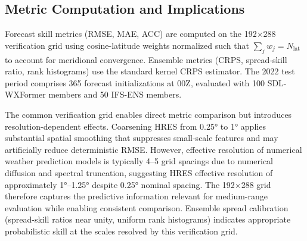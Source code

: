 \documentclass{agujournal2019}
\begin{document}
\subsection{Metric Computation and Implications}

Forecast skill metrics (RMSE, MAE, ACC) are computed on the 192×288 verification grid using cosine-latitude weights normalized such that $\sum_{j} w_j = N_{\text{lat}}$ to account for meridional convergence. Ensemble metrics (CRPS, spread-skill ratio, rank histograms) use the standard kernel CRPS estimator. The 2022 test period comprises 365 forecast initializations at 00Z, evaluated with 100 SDL-WXFormer members and 50 IFS-ENS members.

The common verification grid enables direct metric comparison but introduces resolution-dependent effects. Coarsening HRES from 0.25° to 1° applies substantial spatial smoothing that suppresses small-scale features and may artificially reduce deterministic RMSE. However, effective resolution of numerical weather prediction models is typically 4–5 grid spacings due to numerical diffusion and spectral truncation, suggesting HRES effective resolution of approximately 1°–1.25° despite 0.25° nominal spacing. The 192×288 grid therefore captures the predictive information relevant for medium-range evaluation while enabling consistent comparison. Ensemble spread calibration (spread-skill ratios near unity, uniform rank histograms) indicates appropriate probabilistic skill at the scales resolved by this verification grid.



\end{document}
